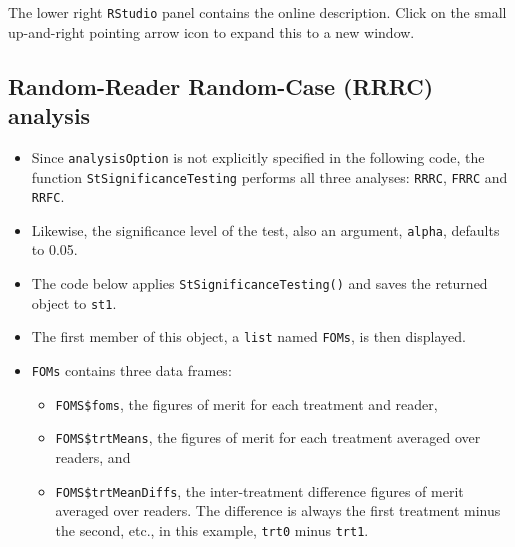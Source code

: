 \documentclass[
]{book}
\newenvironment{Shaded}{\begin{snugshade}}{\end{snugshade}}
\newcommand{\CommentTok}[1]{\textcolor[rgb]{0.56,0.35,0.01}{\textit{#1}}}
\newcommand{\DataTypeTok}[1]{\textcolor[rgb]{0.13,0.29,0.53}{#1}}
\newcommand{\DecValTok}[1]{\textcolor[rgb]{0.00,0.00,0.81}{#1}}
\newcommand{\KeywordTok}[1]{\textcolor[rgb]{0.13,0.29,0.53}{\textbf{#1}}}
\newcommand{\NormalTok}[1]{#1}
\newcommand{\OperatorTok}[1]{\textcolor[rgb]{0.81,0.36,0.00}{\textbf{#1}}}
\newcommand{\StringTok}[1]{\textcolor[rgb]{0.31,0.60,0.02}{#1}}
\providecommand{\tightlist}{%
  \setlength{\itemsep}{0pt}\setlength{\parskip}{0pt}}
\begin{document}
The lower right \texttt{RStudio} panel contains the online description. Click on the small up-and-right pointing arrow icon to expand this to a new window.

\hypertarget{or-applications-RRRC-dataset02-RJafroc}{%
\subsection{Random-Reader Random-Case (RRRC) analysis}\label{or-applications-RRRC-dataset02-RJafroc}}

\begin{itemize}
\tightlist
\item
  Since \texttt{analysisOption} is not explicitly specified in the following code, the function \texttt{StSignificanceTesting} performs all three analyses: \texttt{RRRC}, \texttt{FRRC} and \texttt{RRFC}.
\item
  Likewise, the significance level of the test, also an argument, \texttt{alpha}, defaults to 0.05.
\item
  The code below applies \texttt{StSignificanceTesting()} and saves the returned object to \texttt{st1}.
\item
  The first member of this object, a \texttt{list} named \texttt{FOMs}, is then displayed.
\item
  \texttt{FOMs} contains three data frames:

  \begin{itemize}
  \tightlist
  \item
    \texttt{FOMS\$foms}, the figures of merit for each treatment and reader,
  \item
    \texttt{FOMS\$trtMeans}, the figures of merit for each treatment averaged over readers, and
  \item
    \texttt{FOMS\$trtMeanDiffs}, the inter-treatment difference figures of merit averaged over readers. The difference is always the first treatment minus the second, etc., in this example, \texttt{trt0} minus \texttt{trt1}.
  \end{itemize}
\end{itemize}

\begin{Shaded}
\end{Shaded}
\end{document}
